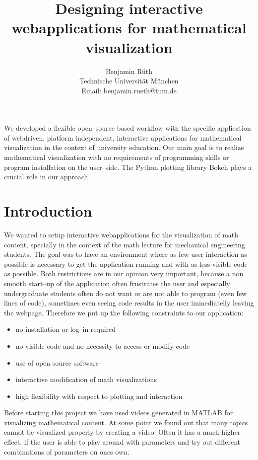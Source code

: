 \documentclass[a4paper,pdftex]{scrartcl}
\begin{document}
\title{Designing interactive webapplications for mathematical visualization}
\subtitle{}

\author{
Benjamin Rüth\\
Technische Universit\"at M\"unchen\\
Email: benjamin.rueth@tum.de 
}

\maketitle

We developed a flexible open--source based workflow with the specific application of webdriven, platform independent, interactive applications for mathematical visualization in the context of university education. Our main goal is to realize mathematical visualization with no requirements of programming skills or program installation on the user--side. The Python plotting library Bokeh plays a crucial role in our approach.

\section{Introduction}
We wanted to setup interactive webapplications for the visualization of math content, specially in the context of the math lecture for mechanical engineering students. The goal was to have an environment where as few user interaction as possible is necessary to get the application running and with as less visible code as possible. Both restrictions are in our opinion very important, because a non smooth start--up of the application often frustrates the user and especially undergraduate students often do not want or are not able to program (even few lines of code), sometimes even seeing code results in the user immediatelly leaving the webpage. Therefore we put up the following constraints to our application:
\begin{itemize}
\item no installation or log--in required
\item no visible code and no necessity to access or modify code 
\item use of open source software
\item interactive modification of math visualizations
\item high flexibility with respect to plotting and interaction
\end{itemize}
Before starting this project we have used videos generated in MATLAB for visualizing mathematical content. At some point we found out that many topics cannot be visualized properly by creating a video. Often it has a much higher effect, if the user is able to play around with parameters and try out different combinations of parameters on ones own.
\end{document}
